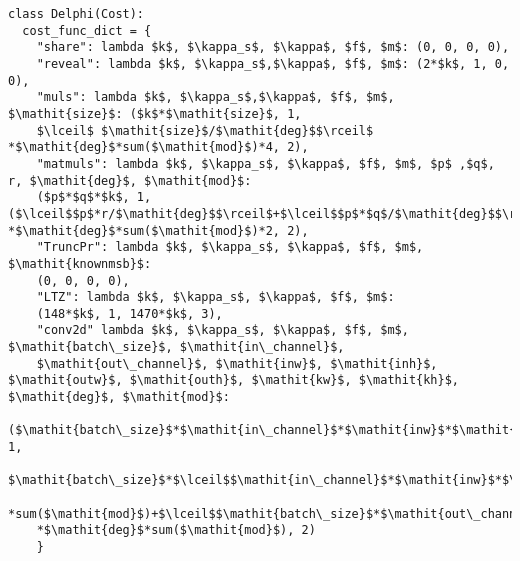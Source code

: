 \begin{lstlisting}[mathescape,xleftmargin=2em,framexleftmargin=2em, caption = {Communication cost configuration for basic operations of \texttt{Delphi}~\cite{mishra2020delphi}.}, columns=fullflexible, label = {list:delphi_cost}]
class Delphi(Cost):
  cost_func_dict = {
    "share": lambda $k$, $\kappa_s$, $\kappa$, $f$, $m$: (0, 0, 0, 0),
    "reveal": lambda $k$, $\kappa_s$,$\kappa$, $f$, $m$: (2*$k$, 1, 0, 0),
    "muls": lambda $k$, $\kappa_s$,$\kappa$, $f$, $m$, $\mathit{size}$: ($k$*$\mathit{size}$, 1, 
    $\lceil$ $\mathit{size}$/$\mathit{deg}$$\rceil$ *$\mathit{deg}$*sum($\mathit{mod}$)*4, 2),
    "matmuls": lambda $k$, $\kappa_s$, $\kappa$, $f$, $m$, $p$ ,$q$, r, $\mathit{deg}$, $\mathit{mod}$: 
    ($p$*$q$*$k$, 1, ($\lceil$$p$*r/$\mathit{deg}$$\rceil$+$\lceil$$p$*$q$/$\mathit{deg}$$\rceil$) *$\mathit{deg}$*sum($\mathit{mod}$)*2, 2),
    "TruncPr": lambda $k$, $\kappa_s$, $\kappa$, $f$, $m$, $\mathit{knownmsb}$: 
    (0, 0, 0, 0),    
    "LTZ": lambda $k$, $\kappa_s$, $\kappa$, $f$, $m$:  
    (148*$k$, 1, 1470*$k$, 3),
    "conv2d" lambda $k$, $\kappa_s$, $\kappa$, $f$, $m$, $\mathit{batch\_size}$, $\mathit{in\_channel}$, 
    $\mathit{out\_channel}$, $\mathit{inw}$, $\mathit{inh}$, $\mathit{outw}$, $\mathit{outh}$, $\mathit{kw}$, $\mathit{kh}$, $\mathit{deg}$, $\mathit{mod}$: 
    ($\mathit{batch\_size}$*$\mathit{in\_channel}$*$\mathit{inw}$*$\mathit{inh}$*$k$, 1,
    $\mathit{batch\_size}$*$\lceil$$\mathit{in\_channel}$*$\mathit{inw}$*$\mathit{inh}$/$\mathit{deg}$$\rceil$*$\mathit{kw}$*$\mathit{kh}$*$\mathit{deg}$
    *sum($\mathit{mod}$)+$\lceil$$\mathit{batch\_size}$*$\mathit{out\_channel}$*$\mathit{outw}$*$\mathit{outh}$/$\mathit{deg}$$\rceil$
    *$\mathit{deg}$*sum($\mathit{mod}$), 2)
    }
\end{lstlisting}
 

